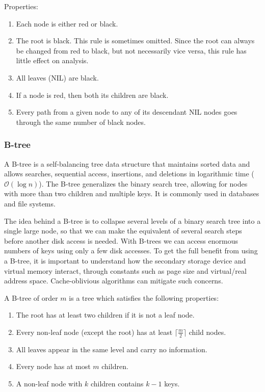\documentclass{article}
\newcommand{\bigO}{\ensuremath{\mathcal{O}}}
\begin{document}
    Properties:
    \begin{enumerate}
        \item Each node is either red or black.
        \item The root is black. This rule is sometimes omitted. Since the root can always be changed from red to black, but not necessarily vice versa, this rule has little effect on analysis.
        \item All leaves (NIL) are black.
        \item If a node is red, then both its children are black.
        \item Every path from a given node to any of its descendant NIL nodes goes through the same number of black nodes.
    \end{enumerate}
    
    \subsubsection{B-tree}
    A B-tree is a self-balancing tree data structure that maintains sorted data and allows searches, sequential access, insertions, and deletions in logarithmic time ($\bigO(\log n)$). The B-tree generalizes the binary search tree, allowing for nodes with more than two children and multiple keys. It is commonly used in databases and file systems.
    
    The idea behind a B-tree is to collapse several levels of a binary search tree into a single large node, so that we can make the equivalent of several search steps before another disk access is needed. With B-trees we can access enormous numbers of keys using only a few disk accesses. To get the full benefit from using a B-tree, it is important to understand how the secondary storage device and virtual memory interact, through constants such as page size and virtual/real address space. Cache-oblivious algorithms can mitigate such concerns.
    
    A B-tree of order $m$ is a tree which satisfies the following properties:
    \begin{enumerate}
        \item The root has at least two children if it is not a leaf node.
        \item Every non-leaf node (except the root) has at least $ \lceil \frac{m}{2} \rceil$ child nodes.
        \item All leaves appear in the same level and carry no information.
        \item Every node has at most $m$ children.
        \item A non-leaf node with $k$ children contains $k-1$ keys.
    \end{enumerate}
    
\end{document}
